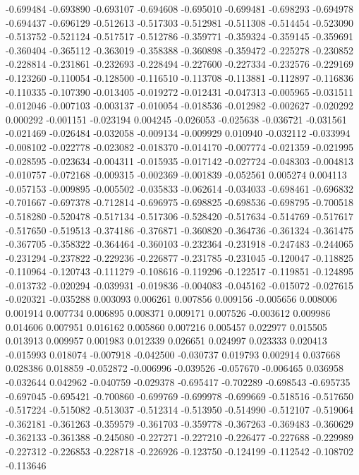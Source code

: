 -0.699484
-0.693890
-0.693107
-0.694608
-0.695010
-0.699481
-0.698293
-0.694978
-0.694437
-0.696129
-0.512613
-0.517303
-0.512981
-0.511308
-0.514454
-0.523090
-0.513752
-0.521124
-0.517517
-0.512786
-0.359771
-0.359324
-0.359145
-0.359691
-0.360404
-0.365112
-0.363019
-0.358388
-0.360898
-0.359472
-0.225278
-0.230852
-0.228814
-0.231861
-0.232693
-0.228494
-0.227600
-0.227334
-0.232576
-0.229169
-0.123260
-0.110054
-0.128500
-0.116510
-0.113708
-0.113881
-0.112897
-0.116836
-0.110335
-0.107390
-0.013405
-0.019272
-0.012431
-0.047313
-0.005965
-0.031511
-0.012046
-0.007103
-0.003137
-0.010054
-0.018536
-0.012982
-0.002627
-0.020292
0.000292
-0.001151
-0.023194
0.004245
-0.026053
-0.025638
-0.036721
-0.031561
-0.021469
-0.026484
-0.032058
-0.009134
-0.009929
0.010940
-0.032112
-0.033994
-0.008102
-0.022778
-0.023082
-0.018370
-0.014170
-0.007774
-0.021359
-0.021995
-0.028595
-0.023634
-0.004311
-0.015935
-0.017142
-0.027724
-0.048303
-0.004813
-0.010757
-0.072168
-0.009315
-0.002369
-0.001839
-0.052561
0.005274
0.004113
-0.057153
-0.009895
-0.005502
-0.035833
-0.062614
-0.034033
-0.698461
-0.696832
-0.701667
-0.697378
-0.712814
-0.696975
-0.698825
-0.698536
-0.698795
-0.700518
-0.518280
-0.520478
-0.517134
-0.517306
-0.528420
-0.517634
-0.514769
-0.517617
-0.517650
-0.519513
-0.374186
-0.376871
-0.360820
-0.364736
-0.361324
-0.361475
-0.367705
-0.358322
-0.364464
-0.360103
-0.232364
-0.231918
-0.247483
-0.244065
-0.231294
-0.237822
-0.229236
-0.226877
-0.231785
-0.231045
-0.120047
-0.118825
-0.110964
-0.120743
-0.111279
-0.108616
-0.119296
-0.122517
-0.119851
-0.124895
-0.013732
-0.020294
-0.039931
-0.019836
-0.004083
-0.045162
-0.015072
-0.027615
-0.020321
-0.035288
0.003093
0.006261
0.007856
0.009156
-0.005656
0.008006
0.001914
0.007734
0.006895
0.008371
0.009171
0.007526
-0.003612
0.009986
0.014606
0.007951
0.016162
0.005860
0.007216
0.005457
0.022977
0.015505
0.013913
0.009957
0.001983
0.012339
0.026651
0.024997
0.023333
0.020413
-0.015993
0.018074
-0.007918
-0.042500
-0.030737
0.019793
0.002914
0.037668
0.028386
0.018859
-0.052872
-0.006996
-0.039526
-0.057670
-0.006465
0.036958
-0.032644
0.042962
-0.040759
-0.029378
-0.695417
-0.702289
-0.698543
-0.695735
-0.697045
-0.695421
-0.700860
-0.699769
-0.699978
-0.699669
-0.518516
-0.517650
-0.517224
-0.515082
-0.513037
-0.512314
-0.513950
-0.514990
-0.512107
-0.519064
-0.362181
-0.361263
-0.359579
-0.361703
-0.359778
-0.367263
-0.369483
-0.360629
-0.362133
-0.361388
-0.245080
-0.227271
-0.227210
-0.226477
-0.227688
-0.229989
-0.227312
-0.226853
-0.228718
-0.226926
-0.123750
-0.124199
-0.112542
-0.108702
-0.113646
